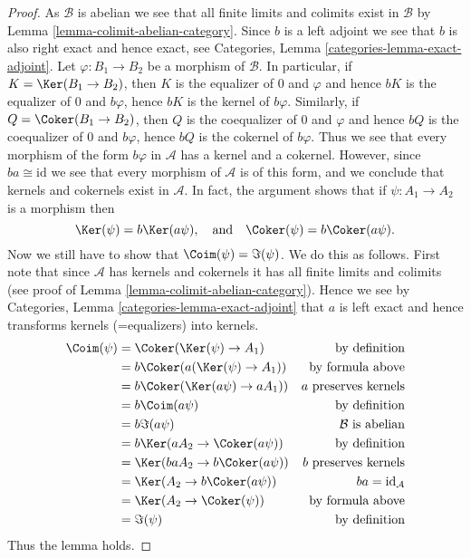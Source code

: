 \begin{proof}
As $\mathcal{B}$ is abelian we see that all finite limits and colimits
exist in $\mathcal{B}$ by Lemma \ref{lemma-colimit-abelian-category}.
Since $b$ is a left adjoint we see that $b$ is also right exact
and hence exact, see
Categories, Lemma \ref{categories-lemma-exact-adjoint}.
Let $\varphi : B_1 \to B_2$ be a morphism of $\mathcal{B}$.
In particular, if $K = \Ker(B_1 \to B_2)$, then $K$ is
the equalizer of $0$ and $\varphi$ and hence
$bK$ is the equalizer of $0$ and $b\varphi$, hence
$bK$ is the kernel of $b\varphi$. Similarly, if
$Q = \Coker(B_1 \to B_2)$, then $Q$ is
the coequalizer of $0$ and $\varphi$ and hence
$bQ$ is the coequalizer of $0$ and $b\varphi$, hence
$bQ$ is the cokernel of $b\varphi$. Thus we see that every morphism
of the form $b\varphi$ in $\mathcal{A}$ has a kernel and a cokernel.
However, since $ba \cong \text{id}$ we see that every morphism of
$\mathcal{A}$ is of this form, and we conclude that kernels and
cokernels exist in $\mathcal{A}$. In fact, the argument shows that
if $\psi : A_1 \to A_2$ is a morphism then
$$
\Ker(\psi) = b\Ker(a\psi),
\quad\text{and}\quad
\Coker(\psi) = b\Coker(a\psi).
$$
Now we still have to show that $\Coim(\psi)= \Im(\psi)$.
We do this as follows.
First note that since $\mathcal{A}$ has kernels and cokernels it
has all finite limits and colimits (see proof of
Lemma \ref{lemma-colimit-abelian-category}).
Hence we see by Categories, Lemma \ref{categories-lemma-exact-adjoint}
that $a$ is left exact and
hence transforms kernels (=equalizers) into kernels.
\begin{align*}
\Coim(\psi)
& =
\Coker(\Ker(\psi) \to A_1)
& \text{by definition} \\
& =
b\Coker(a(\Ker(\psi) \to A_1))
& \text{by formula above} \\
& =
b\Coker(\Ker(a\psi) \to aA_1))
& a\text{ preserves kernels} \\
& =
b\Coim(a\psi)
& \text{by definition} \\
& =
b\Im(a\psi)
& \mathcal{B}\text{ is abelian} \\
& =
b\Ker(aA_2 \to \Coker(a\psi))
& \text{by definition} \\
& =
\Ker(baA_2 \to b\Coker(a\psi))
& b\text{ preserves kernels} \\
& =
\Ker(A_2 \to b\Coker(a\psi))
& ba = \text{id}_\mathcal{A} \\
& =
\Ker(A_2 \to \Coker(\psi))
& \text{by formula above} \\
& =
\Im(\psi)
& \text{by definition}
\end{align*}
Thus the lemma holds.
\end{proof}




